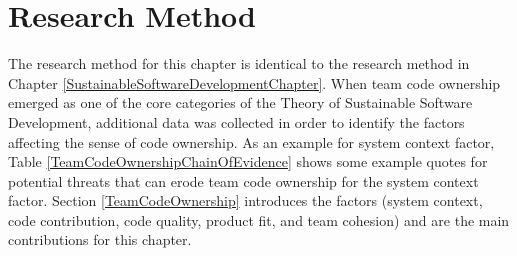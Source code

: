 \section{Research Method}
\label{TeamCodeOwnershipResearchMethod}


The research method for this chapter is identical to the research method in Chapter \ref{SustainableSoftwareDevelopmentChapter}. When team code ownership emerged as one of the core categories of the Theory of Sustainable Software Development, additional data was collected in order to identify the factors affecting the sense of code ownership. As an example for system context factor, Table \ref{TeamCodeOwnershipChainOfEvidence} shows some example quotes for potential threats that can erode team code ownership for the system context factor. Section \ref{TeamCodeOwnership} introduces the factors (system context, code contribution, code quality, product fit, and team cohesion) and are the main contributions for this chapter.  


